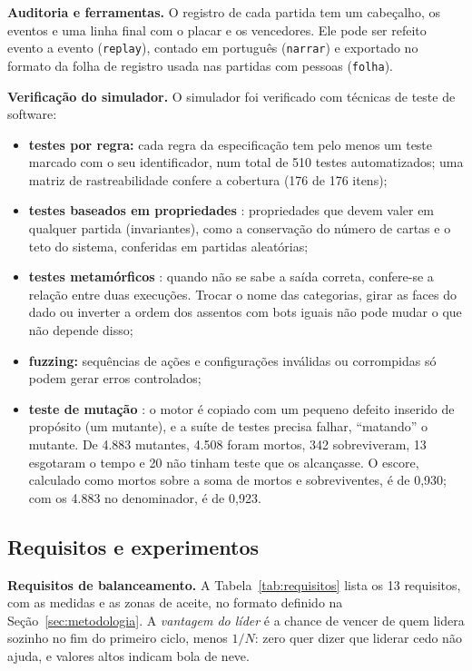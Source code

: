 \textbf{Auditoria e ferramentas.} O registro de cada partida tem um cabeçalho, os eventos e uma linha final com
o placar e os vencedores. Ele pode ser refeito evento a evento (\texttt{replay}), contado em português
(\texttt{narrar}) e exportado no formato da folha de registro usada nas partidas com pessoas (\texttt{folha}).

\textbf{Verificação do simulador.} O simulador foi verificado com técnicas de teste de software:
\begin{itemize}
  \item \textbf{testes por regra:} cada regra da especificação tem pelo menos um teste marcado com o seu
    identificador, num total de 510 testes automatizados; uma matriz de rastreabilidade confere a cobertura (176
    de 176 itens);
  \item \textbf{testes baseados em propriedades} \cite{claessen2000,maciver2019}: propriedades que devem valer em
    qualquer partida (invariantes), como a conservação do número de cartas e o teto do sistema, conferidas em
    partidas aleatórias;
  \item \textbf{testes metamórficos} \cite{chen1998,segura2016}: quando não se sabe a saída correta, confere-se a
    relação entre duas execuções. Trocar o nome das categorias, girar as faces do dado ou inverter a ordem dos
    assentos com bots iguais não pode mudar o que não depende disso;
  \item \textbf{fuzzing:} sequências de ações e configurações inválidas ou corrompidas só podem gerar
    erros controlados;
  \item \textbf{teste de mutação} \cite{jia2011}: o motor é copiado com um pequeno defeito inserido de propósito
    (um mutante), e a suíte de testes precisa falhar, ``matando'' o mutante. De 4.883 mutantes, 4.508 foram
    mortos, 342 sobreviveram, 13 esgotaram o tempo e 20 não tinham teste que os alcançasse. O escore,
    calculado como mortos sobre a soma de mortos e sobreviventes, é de 0,930; com os 4.883 no denominador, é de
    0,923.
\end{itemize}

\subsection{Requisitos e experimentos}
\label{sec:requisitos-experimentos}

\textbf{Requisitos de balanceamento.} A Tabela~\ref{tab:requisitos} lista os 13 requisitos, com as medidas e as
zonas de aceite, no formato definido na Seção~\ref{sec:metodologia}. A \emph{vantagem do líder} é a chance de vencer de quem
lidera sozinho no fim do primeiro ciclo, menos $1/N$: zero quer dizer que liderar cedo não ajuda, e valores altos
indicam bola de neve.

